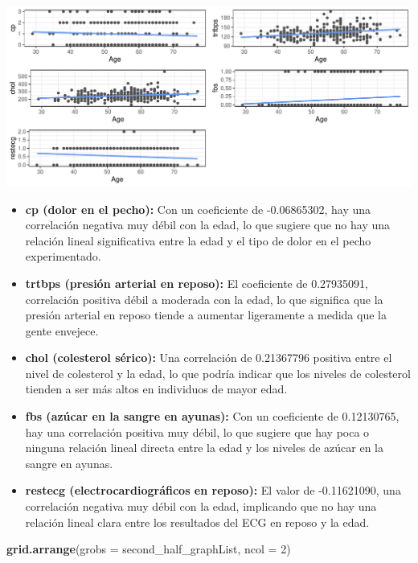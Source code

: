 \documentclass[
]{article}
\newenvironment{Shaded}{\begin{snugshade}}{\end{snugshade}}
\newcommand{\AttributeTok}[1]{\textcolor[rgb]{0.13,0.29,0.53}{#1}}
\newcommand{\DecValTok}[1]{\textcolor[rgb]{0.00,0.00,0.81}{#1}}
\newcommand{\FunctionTok}[1]{\textcolor[rgb]{0.13,0.29,0.53}{\textbf{#1}}}
\newcommand{\NormalTok}[1]{#1}
\begin{document}
\includegraphics{coyolaf_ChristianOyola-PRA2_files/figure-latex/unnamed-chunk-16-1.pdf}

\begin{itemize}
\item
  \textbf{cp (dolor en el pecho):} Con un coeficiente de -0.06865302,
  hay una correlación negativa muy débil con la edad, lo que sugiere que
  no hay una relación lineal significativa entre la edad y el tipo de
  dolor en el pecho experimentado.
\item
  \textbf{trtbps (presión arterial en reposo):} El coeficiente de
  0.27935091, correlación positiva débil a moderada con la edad, lo que
  significa que la presión arterial en reposo tiende a aumentar
  ligeramente a medida que la gente envejece.
\item
  \textbf{chol (colesterol sérico):} Una correlación de 0.21367796
  positiva entre el nivel de colesterol y la edad, lo que podría indicar
  que los niveles de colesterol tienden a ser más altos en individuos de
  mayor edad.
\item
  \textbf{fbs (azúcar en la sangre en ayunas):} Con un coeficiente de
  0.12130765, hay una correlación positiva muy débil, lo que sugiere que
  hay poca o ninguna relación lineal directa entre la edad y los niveles
  de azúcar en la sangre en ayunas.
\item
  \textbf{restecg (electrocardiográficos en reposo):} El valor de
  -0.11621090, una correlación negativa muy débil con la edad,
  implicando que no hay una relación lineal clara entre los resultados
  del ECG en reposo y la edad.
\end{itemize}

\begin{Shaded}
\begin{Highlighting}[]
\FunctionTok{grid.arrange}\NormalTok{(}\AttributeTok{grobs =}\NormalTok{ second\_half\_graphList, }\AttributeTok{ncol =} \DecValTok{2}\NormalTok{)}
\end{Highlighting}
\end{Shaded}
\end{document}
